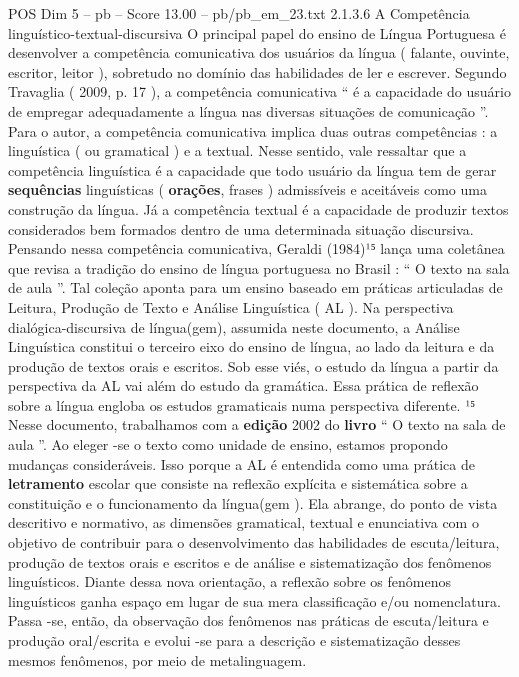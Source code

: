 \begin{textsample}{POS Dim 5 – pb – Score 13.00 – pb/pb\_em\_23.txt}  \label{ex:f5_pos_092}
2.1.3.6 A Competência linguístico-textual-discursiva O principal papel do ensino de Língua Portuguesa é desenvolver a competência comunicativa dos usuários da língua ( falante, ouvinte, escritor, leitor ), sobretudo no domínio das habilidades de ler e escrever.
Segundo Travaglia ( 2009, p. 17 ), a competência comunicativa “ é a capacidade do usuário de empregar adequadamente a língua nas diversas situações de comunicação ”.
Para o autor, a competência comunicativa implica duas outras competências : a linguística ( ou gramatical ) e a textual.
Nesse sentido, vale ressaltar que a competência linguística é a capacidade que todo usuário da língua tem de gerar \textbf{sequências} linguísticas ( \textbf{orações}, frases ) admissíveis e aceitáveis como uma construção da língua.
Já a competência textual é a capacidade de produzir textos considerados bem formados dentro de uma determinada situação discursiva.
Pensando nessa competência comunicativa, Geraldi (1984)¹⁵ lança uma coletânea que revisa a tradição do ensino de língua portuguesa no Brasil : “ O texto na sala de aula ”.
Tal coleção aponta para um ensino baseado em práticas articuladas de Leitura, Produção de Texto e Análise Linguística ( AL ).
Na perspectiva dialógica-discursiva de língua(gem), assumida neste documento, a Análise Linguística constitui o terceiro eixo do ensino de língua, ao lado da leitura e da produção de textos orais e escritos.
Sob esse viés, o estudo da língua a partir da perspectiva da AL vai além do estudo da gramática.
Essa prática de reflexão sobre a língua engloba os estudos gramaticais numa perspectiva diferente. ¹⁵ Nesse documento, trabalhamos com a \textbf{edição} 2002 do \textbf{livro} “ O texto na sala de aula ”.
Ao eleger -se o texto como unidade de ensino, estamos propondo mudanças consideráveis.
Isso porque a AL é entendida como uma prática de \textbf{letramento} escolar que consiste na reflexão explícita e sistemática sobre a constituição e o funcionamento da língua(gem ).
Ela abrange, do ponto de vista descritivo e normativo, as dimensões gramatical, textual e enunciativa com o objetivo de contribuir para o desenvolvimento das habilidades de escuta/leitura, produção de textos orais e escritos e de análise e sistematização dos fenômenos linguísticos.
Diante dessa nova orientação, a reflexão sobre os fenômenos linguísticos ganha espaço em lugar de sua mera classificação e/ou nomenclatura.
Passa -se, então, da observação dos fenômenos nas práticas de escuta/leitura e produção oral/escrita e evolui -se para a descrição e sistematização desses mesmos fenômenos, por meio de metalinguagem.

\end{textsample}
